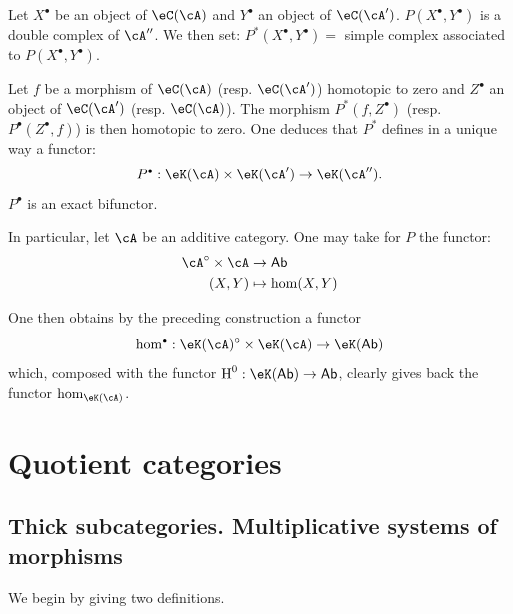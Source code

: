 Let $X^\bullet$ be an object of $\eC(\cA)$ and $Y^\bullet$ an object of
$\eC(\cA')$. $P(X^\bullet,Y^\bullet)$ is a double complex of $\cA''$. We
then set: $P^\ast(X^\bullet,Y^\bullet) = $ simple complex associated to
$P(X^\bullet,Y^\bullet)$.

Let $f$ be a morphism of $\eC(\cA)$ (resp. $\eC(\cA')$) homotopic to zero
and $Z^\bullet$ an object of $\eC(\cA')$ (resp. $\eC(\cA)$). The morphism
$P^\ast(f,Z^\bullet)$ (resp. $P^\bullet(Z^\bullet,f)$) is then homotopic to
zero. One deduces that $P^\ast$ defines in a unique way a
functor:
\[
  P^\bullet:\eK(\cA) \times \eK(\cA') \to \eK(\cA'') \text{.}
\]
$P^\bullet$ is an exact bifunctor.

In particular, let $\cA$ be an additive category. One may take for $P$ the
functor: 
\begin{align*}
  \cA^\circ\times \cA &\to \mathsf{Ab} \\
  (X,Y) &\mapsto \hom(X,Y) 
\end{align*}

One then obtains by the preceding construction a functor
\[
  \hom^\bullet:\eK(\cA)^\circ \times \eK(\cA) \to \eK(\mathsf{Ab})
\]
which, composed with the functor $\h^0:\eK(\mathsf{Ab})\to \mathsf{Ab}$,
clearly gives back the functor $\hom_{\eK(\cA)}$. 




















\section{Quotient categories}\label{VIII:2}










\subsection{Thick subcategories. Multiplicative systems of morphisms}\label{VIII:2-1}

We begin by giving two definitions. 





